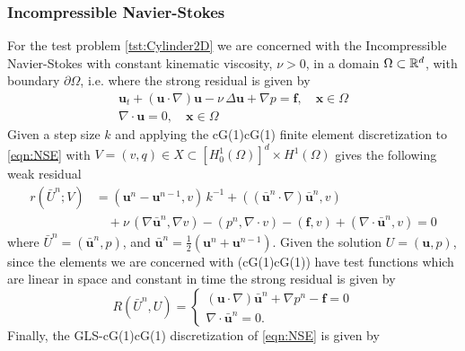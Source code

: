 \subsubsection{Incompressible Navier-Stokes}
For the test problem \ref{tst:Cylinder2D} we are concerned with the
Incompressible Navier-Stokes with constant kinematic viscosity, $\nu>0$, in a
domain $\Omega\subset \mathbb{R}^d$, with boundary $\partial \Omega$, i.e.  where the
strong residual is given by
\begin{equation}
    \begin{split}
      \mathbf{u}_t + \left( \mathbf{u} \cdot \nabla \right) \mathbf{u} - \nu\,
          \Delta \mathbf{u} + \nabla p = \mathbf{f}, \quad \mathbf{x} \in \Omega \\
          \nabla \cdot \mathbf{u} = 0, \quad \mathbf{x} \in \Omega
    \end{split}
  \label{eqn:NSE}
\end{equation}
Given a step size $k$ and applying the cG(1)cG(1) finite element discretization
to \autoref{eqn:NSE} with $V = (v, q) \in X \subset [H^1_0(\Omega)]^d \times
H^1(\Omega)$ gives the following weak residual
\begin{equation}
  \begin{split}
    r(\bar{U}^n; V) &= \left(\mathbf{u}^n - \mathbf{u}^{n-1}, v\right)\,k^{-1}
        + (\left( \bar{\mathbf{u}}^n \cdot \nabla \right) \bar{\mathbf{u}}^n, v) \\
        &\quad+ \nu\, (\nabla \bar{\mathbf{u}}^n, \nabla v)
        - (p^n, \nabla \cdot v) - (\mathbf{f}, v)
        + (\nabla \cdot \bar{\mathbf{u}}^n, v) = 0
  \end{split}
  \label{eqn:WeakNSE}
\end{equation}
where $\bar{U}^n = (\bar{\mathbf{u}}^n,p)$, and $\bar{\mathbf{u}}^n =
\frac{1}{2}\left(\mathbf{u}^n + \mathbf{u}^{n-1}\right)$. Given the solution
$U=(\mathbf{u},p)$, since the elements we are concerned with (cG(1)cG(1)) have
test functions which are linear in space and constant in time the strong
residual is given by
\begin{equation}
    R(\bar{U}^n,U) = \begin{cases}
      \left(\mathbf{u} \cdot \nabla \right) \bar{\mathbf{u}}^n
        + \nabla p^n - \mathbf{f} = 0 \\
      \nabla \cdot \bar{\mathbf{u}}^n = 0.
    \end{cases}
  \label{eqn:StrongNSE}
\end{equation}
Finally, the GLS-cG(1)cG(1) discretization of \eqref{eqn:NSE} is given by

